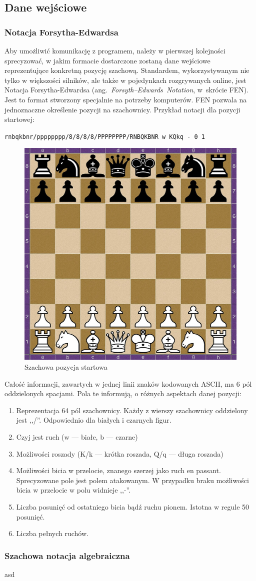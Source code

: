 \subsection{Dane wejściowe}
\label{subsec:dane-wejsciowe}

\subsubsection{Notacja Forsytha-Edwardsa}

Aby umożliwić komunikację z programem, należy w pierwszej kolejności sprecyzować, w jakim formacie dostarczone zostaną dane wejściowe reprezentujące konkretną pozycję szachową.
Standardem, wykorzystywanym nie tylko w większości silników, ale także w pojedynkach rozgrywanych online, jest Notacja Forsytha-Edwardsa (ang.~\emph{Forsyth–Edwards~Notation}, w~skrócie FEN).
Jest to format stworzony specjalnie na potrzeby komputerów.
FEN pozwala na jednoznaczne określenie pozycji na szachownicy.
Przykład notacji dla pozycji startowej:

\vspace{5mm}
\centerline{
    \lstset{basicstyle=\ttfamily}\lstinline{rnbqkbnr/pppppppp/8/8/8/8/PPPPPPPP/RNBQKBNR w KQkq - 0 1}
}

\begin{figure}[ht] \centering
    \includegraphics[width=0.3\linewidth]{rozdzialy/rozdzial01/1_uniwersalny-interfejs-szachowy/rysunki/pozycja_startowa}
    \caption{Szachowa pozycja startowa}
    \label{fig:figure}
\end{figure}

Całość informacji, zawartych w jednej linii znaków kodowanych ASCII, ma 6 pól oddzielonych spacjami.
Pola te informują, o różnych aspektach danej pozycji:

\begin{enumerate}
    \item Reprezentacja 64 pól szachownicy.
    Każdy z wierszy szachownicy oddzielony jest ,,/''.
    Odpowiednio dla białych i czarnych figur.
    \item Czyj jest ruch (w — białe, b — czarne)
    \item Możliwości roszady (K/k — krótka roszada, Q/q — długa roszada)
    \item Możliwości bicia w przelocie, znanego szerzej jako ruch en passant.
    Sprecyzowane pole jest polem atakowanym.
    W przypadku braku możliwości bicia w przelocie w polu widnieje ,,-''.
    \item Liczba posunięć od ostatniego bicia bądź ruchu pionem.
    Istotna w regule 50 posunięć.
    \item Liczba pełnych ruchów.
\end{enumerate}

\subsubsection{Szachowa notacja algebraiczna}
asd